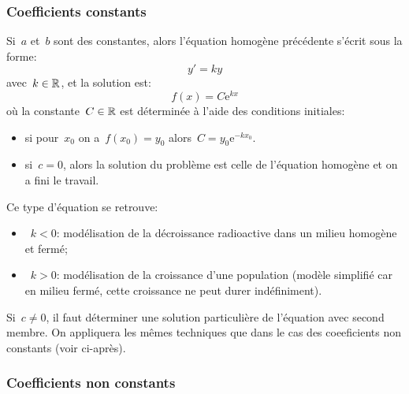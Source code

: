 \subsubsection{Coefficients constants} 
Si~$a$ et~$b$ sont des constantes, alors l'équation homogène précédente s'écrit sous la forme:
\begin{equation}
y' = ky
\end{equation}
avec~$k\in\mathbb R$, et la solution est:
\begin{equation}
f(x) = C\mathrm{e}^{kx}
\end{equation}
où la constante~$C\in\mathbb R$ est déterminée à l'aide des conditions initiales:
\begin{itemize}
\item si pour~$x_0$ on a~$f(x_0) = y_0$ alors~$C = y_0\mathrm{e}^{-kx_0}$. 
\item si~$c=0$, alors la solution du problème est celle de l'équation homogène et on a fini le travail.
\end{itemize} 
Ce type d'équation se retrouve: 
\begin{itemize} 
\item~$k<0$: modélisation de la décroissance radioactive dans un milieu homogène et fermé; 
\item~$k>0$: modélisation de la croissance d'une population (modèle simplifié car en milieu fermé, cette croissance ne peut durer indéfiniment). 
\end{itemize} 
Si~$c\ne0$, il faut déterminer une solution particulière de l'équation avec second membre. On appliquera les mêmes techniques que dans le cas des coeeficients non constants (voir ci-après). 
\subsubsection{Coefficients non constants} 
